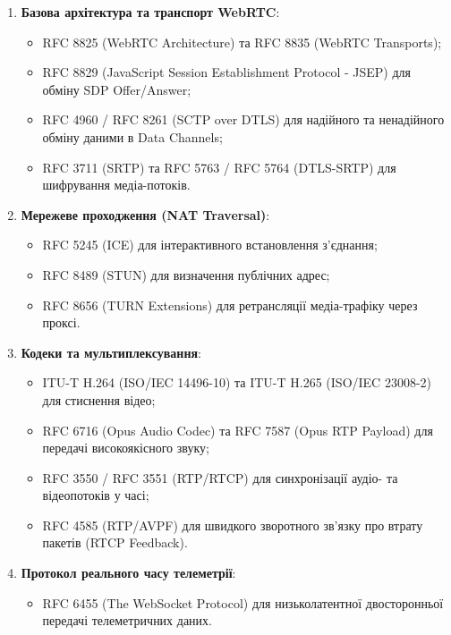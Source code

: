 \documentclass{article}
\begin{document}
\begin{enumerate}
    \item \textbf{Базова архітектура та транспорт WebRTC}:
    \begin{itemize}
        \item RFC 8825 (WebRTC Architecture) та RFC 8835 (WebRTC Transports);
        \item RFC 8829 (JavaScript Session Establishment Protocol - JSEP) для обміну SDP Offer/Answer;
        \item RFC 4960 / RFC 8261 (SCTP over DTLS) для надійного та ненадійного обміну даними в Data Channels;
        \item RFC 3711 (SRTP) та RFC 5763 / RFC 5764 (DTLS-SRTP) для шифрування медіа-потоків.
    \end{itemize}
    \item \textbf{Мережеве проходження (NAT Traversal)}:
    \begin{itemize}
        \item RFC 5245 (ICE) для інтерактивного встановлення з'єднання;
        \item RFC 8489 (STUN) для визначення публічних адрес;
        \item RFC 8656 (TURN Extensions) для ретрансляції медіа-трафіку через проксі.
    \end{itemize}
    \item \textbf{Кодеки та мультиплексування}:
    \begin{itemize}
        \item ITU-T H.264 (ISO/IEC 14496-10) та ITU-T H.265 (ISO/IEC 23008-2) для стиснення відео;
        \item RFC 6716 (Opus Audio Codec) та RFC 7587 (Opus RTP Payload) для передачі високоякісного звуку;
        \item RFC 3550 / RFC 3551 (RTP/RTCP) для синхронізації аудіо- та відеопотоків у часі;
        \item RFC 4585 (RTP/AVPF) для швидкого зворотного зв'язку про втрату пакетів (RTCP Feedback).
    \end{itemize}
    \item \textbf{Протокол реального часу телеметрії}:
    \begin{itemize}
        \item RFC 6455 (The WebSocket Protocol) для низьколатентної двосторонньої передачі телеметричних даних.
    \end{itemize}
\end{enumerate}
\end{document}
